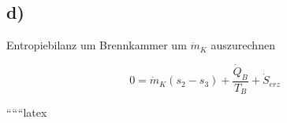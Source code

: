 

\subsection*{d)}
Entropiebilanz um Brennkammer um $\dot{m}_K$ auszurechnen

\[
0 = \dot{m}_K (s_2 - s_3) + \frac{\dot{Q}_B}{T_B} + \dot{S}_{erz}
\]

``````latex